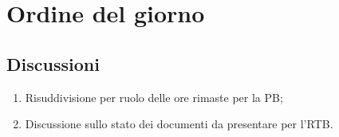 \section{Ordine del giorno} \label{sec:agenda}
\subsection{Discussioni} \label{subsec:discussione}
\begin{enumerate}
    \item Risuddivisione per ruolo delle ore rimaste per la PB;
    \item Discussione sullo stato dei documenti da presentare per l’RTB.

    
\end{enumerate}

